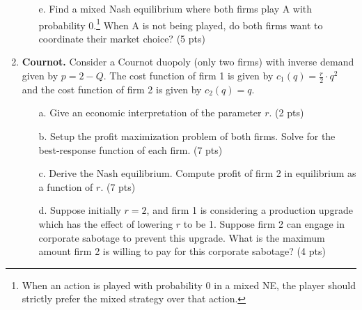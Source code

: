 \documentclass{article}
\begin{document}
\begin{enumerate}
\begin{enumerate}
          \vspace{4cm}
          
          \item[e.] Find a mixed Nash equilibrium where both firms play A with probability 0.\footnote{When an action is played with probability 0 in a mixed NE, the player should strictly prefer the mixed strategy over that action.} When A is not being played, do both firms want to coordinate their market choice? (5 pts)
          
          \vspace{4cm}
          

      \end{enumerate}
     
     \item \textbf{Cournot.} Consider a Cournot duopoly (only two firms) with inverse demand given by $p=2-Q$. The cost function of firm 1 is given by $c_1(q)=\frac{r}{2} \cdot q^2$ and the cost function of firm 2 is given by $c_2(q)=q$.
     
     \begin{enumerate}
         \item[a.]  Give an economic interpretation of the parameter $r$. (2 pts)
         
         \vspace{4cm}
         
         \item[b.] Setup the profit maximization problem of both firms. Solve for the best-response function of each firm. (7 pts)
         \vfill 
         
         \pagebreak
         
         \item[c.] Derive the Nash equilibrium. Compute profit of firm 2 in equilibrium as a function of $r$. (7 pts)
         
         \vspace{8cm}

         \item[d.] Suppose initially $r=2$, and firm 1 is considering a production upgrade which has the effect of lowering $r$ to be 1. Suppose firm 2 can engage in corporate sabotage to prevent this upgrade. What is the maximum amount firm 2 is willing to pay for this corporate sabotage? (4 pts)
         
        \vfill
         
         

\end{enumerate}
\end{enumerate}
\end{document}
